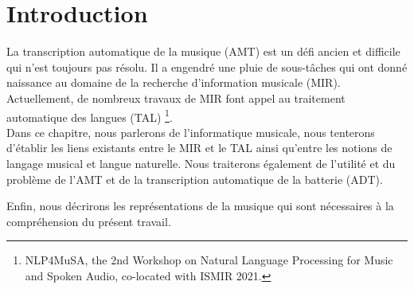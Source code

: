\section*{Introduction}
La transcription automatique de la musique (AMT) est un défi ancien \cite{first_one} et difficile qui n’est toujours pas résolu. Il a engendré une pluie de sous-tâches qui ont donné naissance au domaine de la recherche d’information musicale (MIR). 
Actuellement, de nombreux travaux de MIR font appel au traitement automatique des langues (TAL) \footnote{NLP4MuSA, the 2nd Workshop on Natural Language Processing for Music and Spoken Audio, co-located with ISMIR 2021.}.\\
Dans ce chapitre, nous parlerons de l’informatique musicale, nous tenterons d’établir les liens existants entre le MIR et le TAL ainsi qu’entre les notions de langage musical et langue naturelle. 
Nous traiterons également 
de l’utilité et du problème de l’AMT et de la transcription automatique de la batterie (ADT).

Enfin, nous décrirons les représentations de la musique qui sont nécessaires à la compréhension du présent travail.

